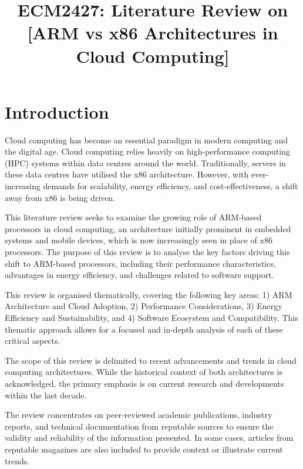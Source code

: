 \documentclass[conference]{IEEEtran}  %
\begin{document}
\title{ECM2427: Literature Review on [ARM vs x86 Architectures in Cloud Computing]}


\author{ %
}


\onecolumn

\twocolumn
\maketitle  %


\section{Introduction} %

Cloud computing has become an essential paradigm in modern computing and the digital age.
Cloud computing relies heavily on high-performance computing (HPC) systems within data centres around the world.
Traditionally, servers in these data centres have utilised the x86 architecture. However, with ever-increasing demands for scalability, energy efficiency, and cost-effectiveness, a shift away from x86 is being driven.

This literature review seeks to examine the growing role of ARM-based processors in cloud computing, an architecture initially prominent in embedded systems and mobile devices, which is now increasingly seen in place of x86 processors.
The purpose of this review is to analyse the key factors driving this shift to ARM-based processors, including their performance characteristics, advantages in energy efficiency, and challenges related to software support.

This review is organised thematically, covering the following key areas: 1) ARM Architecture and Cloud Adoption, 2) Performance Considerations, 3) Energy Efficiency and Sustainability, and 4) Software Ecosystem and Compatibility.
This thematic approach allows for a focused and in-depth analysis of each of these critical aspects.

The scope of this review is delimited to recent advancements and trends in cloud computing architectures.
While the historical context of both architectures is acknowledged, the primary emphasis is on current research and developments within the last decade.

The review concentrates on peer-reviewed academic publications, industry reports, and technical documentation from reputable sources to ensure the validity and reliability of the information presented. In some cases, articles from reputable magazines are also included to provide context or illustrate current trends.
\end{document}

